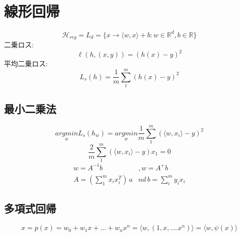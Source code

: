 \documentclass{jarticle}
\theoremstyle{definition}
\begin{document}
\section{線形回帰}
\begin{equation}
\mathcal{H}_{reg} = L_d = \{ x \rightarrow \langle w,x \rangle + b : w \in \mathbb{R}^d,b \in \mathbb{R} \}
\end{equation}
二乗ロス:
\begin{equation}
\ell (h,(x,y)) = (h(x)-y)^2
\end{equation}
平均二乗ロス:
\begin{equation}
L_s(h) = \frac{1}{m} \sum_1^m(h(x)-y)^2
\end{equation}

\subsection{最小二乗法}
\begin{equation}
\underset{w}{argmin}L_s(h_w) = \underset{w}{argmin} \frac{1}{m} \sum_1^m(\langle w,x_i \rangle -y)^2
\end{equation}
\begin{equation}
\frac{2}{m} \sum_1^m(\langle w,x_i \rangle -y)x_1 = 0
\end{equation}
\begin{equation}
\begin{aligned}
w = A^{-1}b & ,w = A^+b \\
A = (\sum_1^mx_ix_i^T) \, a&nd \, b = \sum_i^my_ix_i
\end{aligned}
\end{equation}

\subsection{多項式回帰}
\begin{equation}
x = p(x) = w_0 + w_1x + \dots + w_nx^n = \langle w,(1,x,\dots.x^n) \rangle = \langle w,\psi(x) \rangle
\end{equation}
\end{document}
